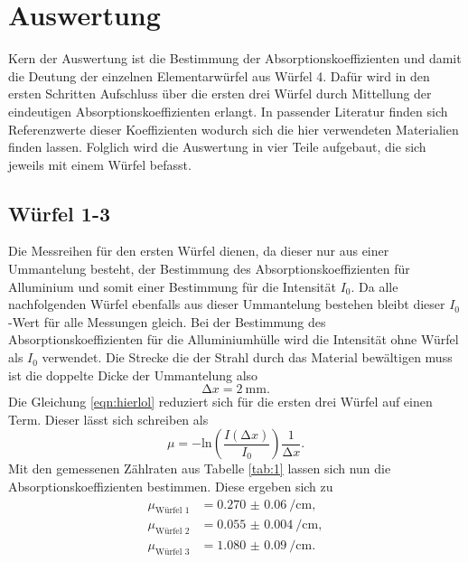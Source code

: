 \section{Auswertung}
Kern der Auswertung ist die Bestimmung der Absorptionskoeffizienten und damit die Deutung der einzelnen Elementarwürfel aus Würfel 4.
Dafür wird in den ersten Schritten Aufschluss über die ersten drei Würfel durch Mittellung der eindeutigen Absorptionskoeffizienten erlangt. 
In passender Literatur \cite{wqs} finden sich Referenzwerte dieser Koeffizienten wodurch sich die hier verwendeten Materialien finden lassen.  
Folglich wird die Auswertung in vier Teile aufgebaut, die sich jeweils mit einem Würfel befasst. 

\subsection{Würfel 1-3}
Die Messreihen für den ersten Würfel dienen, da dieser nur aus einer Ummantelung besteht, der Bestimmung des Absorptionskoeffizienten für Alluminium und somit einer Bestimmung 
für die Intensität $I_0$. Da alle nachfolgenden Würfel ebenfalls aus dieser Ummantelung bestehen bleibt dieser $I_0$-Wert für alle Messungen gleich. Bei der Bestimmung des Absorptionskoeffizienten für die Alluminiumhülle
wird die Intensität ohne Würfel als $I_0$ verwendet. 
Die Strecke die der Strahl durch das Material bewältigen muss ist die doppelte Dicke der Ummantelung also
\begin{equation*}
    \increment x = \SI{2}{\milli\meter}.
\end{equation*}
Die Gleichung \eqref{eqn:hierlol} reduziert sich für die ersten drei Würfel auf einen Term. Dieser lässt sich schreiben als
\begin{equation*}
\mu = - \text{ln} \left( \frac{I(\increment x)}{I_0} \right) \frac{1}{\increment x}.
\end{equation*}
Mit den gemessenen Zählraten aus Tabelle \ref{tab:1} lassen sich nun die Absorptionskoeffizienten bestimmen. Diese ergeben sich zu
\begin{align*}
\mu_{\text{Würfel 1}} &= \SI{0.270(60)}{\per\centi\meter},\\
\mu_{\text{Würfel 2}} &= \SI{0.055(4)}{\per\centi\meter},\\
\mu_{\text{Würfel 3}} &= \SI{1.080(90)}{\per\centi\meter}. 
\end{align*}
